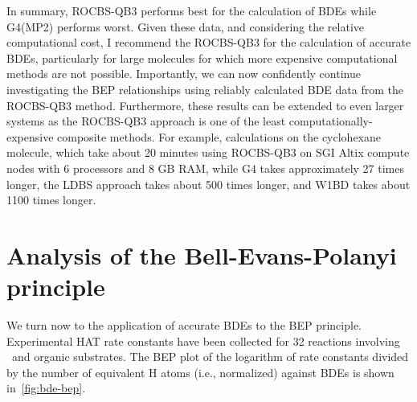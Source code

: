 In summary, ROCBS-QB3 performs best for the calculation of  BDEs while G4(MP2) performs worst. Given these data, and considering the relative computational cost, I recommend the ROCBS-QB3 for the calculation of accurate BDEs, particularly for large molecules for which more expensive computational methods are not possible. Importantly, we can now confidently continue investigating the BEP relationships using reliably calculated BDE data from the ROCBS-QB3 method. Furthermore, these results can be extended to even larger systems as the ROCBS-QB3 approach is one of the least computationally-expensive composite methods. For example, calculations on the cyclohexane molecule, which take about 20 minutes using ROCBS-QB3 on SGI Altix compute nodes with 6 processors and 8 GB RAM, while G4 takes approximately 27 times longer, the LDBS approach takes about 500 times longer, and W1BD takes about 1100 times longer.

\section{Analysis of the Bell-Evans-Polanyi principle}

We turn now to the application of accurate BDEs to the BEP principle. Experimental HAT rate constants have been collected for 32 reactions involving \cumo\ and organic substrates. The BEP plot of the logarithm of rate constants divided by the number of equivalent H atoms (i.e., normalized) against BDEs is shown in~\ref{fig:bde-bep}.

